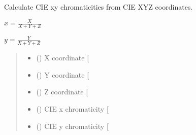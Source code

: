 \documentclass[letterpaper,10pt,english]{sphinxmanual}
\begin{document}
\begin{fulllineitems}
\label{\detokenize{07_colors:skinoptics.colors.xy_from_XYZ}}
\pysigstartsignatures
{}
\pysigstopsignatures
\begin{DUlineblock}{0em}
\item[] Calculate CIE xy chromaticities from CIE XYZ coordinates.
\end{DUlineblock}

\begin{DUlineblock}{0em}
\item[] \(x = \frac{X}{X + Y + Z}\)
\item[] \(y = \frac{Y}{X + Y + Z}\)
\end{DUlineblock}
\begin{quote}\begin{description}
\begin{itemize}
\item {} 
\sphinxAtStartPar
{} () \textendash{} X coordinate {[}\sphinxhyphen{}{]}

\item {} 
\sphinxAtStartPar
{} () \textendash{} Y coordinate {[}\sphinxhyphen{}{]}

\item {} 
\sphinxAtStartPar
{} () \textendash{} Z coordinate {[}\sphinxhyphen{}{]}

\end{itemize}

\sphinxAtStartPar
\begin{itemize}
\item {} 
\sphinxAtStartPar
{} () \textendash{} CIE x chromaticity {[}\sphinxhyphen{}{]}

\item {} 
\sphinxAtStartPar
{} () \textendash{} CIE y chromaticity {[}\sphinxhyphen{}{]}

\end{itemize}


\end{description}\end{quote}

\end{fulllineitems}
\end{document}
